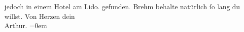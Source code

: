 \begin{ledgroupsized}[t]{13cm}
{{{                  jedoch in einem Hotel am Lido.}}}\label{K_L01677_1h} gefunden.
                  Brehm behalte natürlich ſo lang du willst.\pend
           \pstart
           Von Herzen dein{\\[\baselineskip]}\spacefill\mbox{Arthur.}\pend
           \leftskip=0em{}          \endnumbering{}\end{ledgroupsized}  \newcommand{\dateiname}{L01677}\newcommand{\titel}{Arthur Schnitzler an Hermann Bahr, 20. 5. 1907}\newcommand{\editorInnen}{ Kurt Ifkovits,  Martin Anton Müller}
            \footnotesize
\begin{ledgroupsized}[t]{11.5cm}
\end{ledgroupsized}
         
      